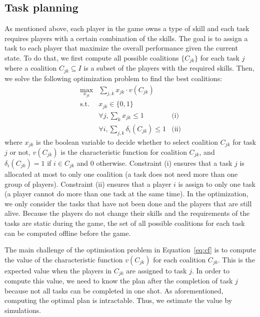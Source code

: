 \subsection{Task planning}
As mentioned above, each player in the game owns a type of skill
and each task requires players with a certain combination of the
skills. The goal is to assign a task to each player that maximize
the overall performance given the current state. To do that, we
first compute all possible coalitions $\{ C_{jk} \}$ for each task
$j$ where a coalition $C_{jk} \subseteq I$ is a subset of the
players with the required skills. Then, we solve the following
optimization problem to find the best coalitions:
\begin{equation}
  \begin{array}{lll}
    \max_{x_{jk}} & \sum_{j, k} x_{jk} \cdot v(C_{jk}) & \\
    \mbox{s.t.} & x_{jk} \in \{0, 1\} & \\
    & \forall j, \sum_{k} x_{jk} \leq 1 & \mbox{(i)} \\
    & \forall i, \sum_{j, k} \delta_i(C_{jk}) \leq 1 & \mbox{(ii)}
  \end{array}
  \label{eq:cf}
\end{equation}
where $x_{jk}$ is the boolean variable to decide whether to select
coalition $C_{jk}$ for task $j$ or not, $v(C_{jk})$ is the
characteristic function for coalition $C_{jk}$, and
$\delta_i(C_{jk}) = 1$ if $i\in C_{jk}$ and 0 otherwise. Constraint
(i) ensures that a task $j$ is allocated at most to only one
coalition (a task does not need more than one group of players).
Constraint (ii) ensures that a player $i$ is assign to only one
task (a player cannot do more than one task at the same time). In
the optimization, we only consider the tasks that have not been
done and the players that are still alive. Because the players do
not change their skills and the requirements of the tasks are
static during the game, the set of all possible coalitions for each
task can be computed offline before the game.

The main challenge of the optimisation problem in
Equation~\ref{eq:cf} is to compute the value of the characteristic
function $v(C_{jk})$ for each coalition $C_{jk}$. This is the
expected value when the players in $C_{jk}$ are assigned to task
$j$. In order to compute this value, we need to know the plan after
the completion of task $j$ because not all tasks can be completed
in one shot. As aforementioned, computing the optimal plan is
intractable. Thus, we estimate the value by simulations.

